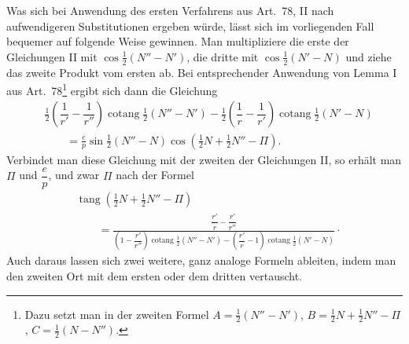 Was sich bei Anwendung des ersten Verfahrens aus Art.\ 78, II nach aufwendigeren Substitutionen ergeben würde, lässt sich im vorliegenden Fall bequemer auf folgende Weise gewinnen. Man multipliziere die erste der Gleichungen II mit $\cos\tfrac12(N''-N')$, die dritte mit $\cos\tfrac12(N'-N)$ und ziehe das zweite Produkt vom ersten ab. Bei entsprechender Anwendung von Lemma I aus Art.\ 78\footnote{Dazu setzt man in der zweiten Formel $A=\tfrac12(N''-N')$, $B=\tfrac12N+\tfrac12N''-\Pi$, $C=\tfrac12(N-N'')$.} ergibt sich dann die Gleichung
\[
\begin{aligned}
&\tfrac12\left(\dfrac1{r'}-\dfrac1{r''}\right)\operatorname{cotang}\tfrac12(N''-N')-\tfrac12\left(\dfrac1r-\dfrac1{r'}\right)\operatorname{cotang}\tfrac12(N'-N)\\[4pt]
&\qquad=\frac{e}{p}\sin\tfrac12(N''-N)\cos(\tfrac12N+\tfrac12N''-\Pi).
\end{aligned}
\]
Verbindet man diese Gleichung mit der zweiten der Gleichungen II, so erhält man $\Pi$ und $\dfrac{e}{p}$, und zwar $\Pi$ nach der Formel
\[
\begin{aligned}
&\operatorname{tang}(\tfrac12N+\tfrac12N''-\Pi)\\[4pt]
&\qquad=\frac{\dfrac{r'}r-\dfrac{r'}{r''}}{\left(1-\dfrac{r'}{r''}\right)\operatorname{cotang}\tfrac12(N''-N')-\left(\dfrac{r'}r-1\right)\operatorname{cotang}\tfrac12(N'-N)}\mathpunct{\cdot}
\end{aligned}
\]
Auch daraus lassen sich zwei weitere, ganz analoge Formeln ableiten, indem man den zweiten Ort mit dem ersten oder dem dritten vertauscht.
